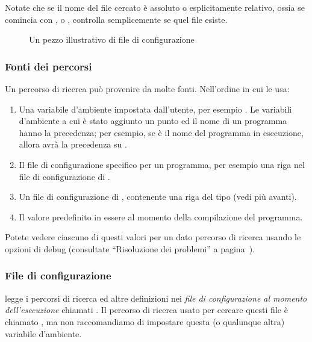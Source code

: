 \documentclass{article}
\begin{document}
Notate che se il nome del file cercato è assoluto o esplicitamente relativo,
ossia se comincia con \samp{/},  o , \KPS{} controlla
semplicemente se quel file esiste.

\ifSingleColumn
\else
\begin{figure*}

\setlength{\abovecaptionskip}{0pt}
  \caption{Un pezzo illustrativo di file di configurazione}
  \label{fig:config-sample}
\end{figure*}
\fi

\subsubsection{Fonti dei percorsi}
\label{sec:path-sources}

Un percorso di ricerca può provenire da molte fonti. Nell'ordine in cui
\KPS{} le usa:

\begin{enumerate}
\item
  Una variabile d'ambiente impostata dall'utente, per esempio
  \@. Le variabili d'ambiente a cui è stato aggiunto un
  punto ed il nome di un programma hanno la precedenza; per esempio, se
   è il nome del programma in esecuzione, allora
   avrà la precedenza su .
\item
  Il file di configurazione specifico per un programma, per esempio una
  riga  nel file di configurazione  di
  .
\item
  Un file di configurazione  di \KPS, contenente una riga
  del tipo  (vedi più avanti).
\item Il valore predefinito in essere al momento della compilazione del 
  programma.
\end{enumerate}
\noindent Potete vedere ciascuno di questi valori per un dato percorso di
ricerca usando le opzioni di debug (consultate ``Risoluzione dei
problemi'' a pagina~\pageref{sec:debugging}).

\subsubsection{File di configurazione}

\KPS{} legge i percorsi di ricerca ed altre definizioni nei \emph{file di
configurazione al momento dell'esecuzione} chiamati . Il
percorso di ricerca usato per cercare questi file è chiamato
, ma non raccomandiamo di impostare questa (o qualunque
altra) variabile d'ambiente.
\end{document}
